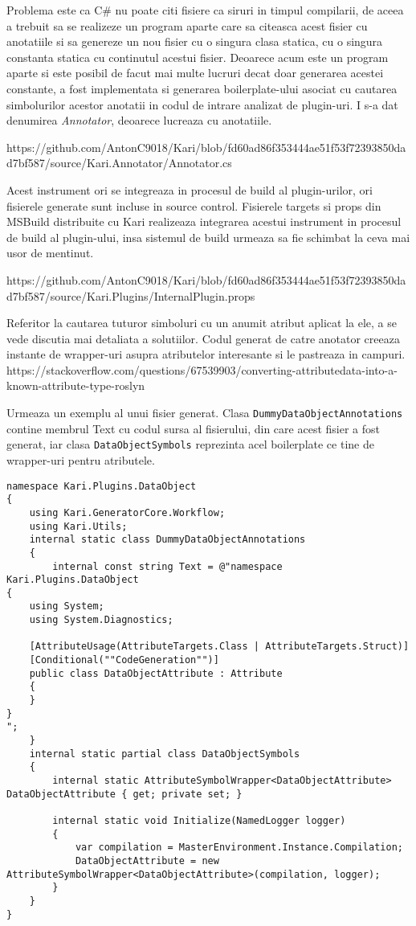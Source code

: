 \documentclass{report}
\begin{document}
Problema este ca C\# nu poate citi fisiere ca siruri in timpul
compilarii, de aceea a trebuit sa se realizeze un program aparte care sa
citeasca acest fisier cu anotatiile si sa genereze un nou fisier cu o
singura clasa statica, cu o singura constanta statica cu continutul
acestui fisier. Deoarece acum este un program aparte si este posibil de
facut mai multe lucruri decat doar generarea acestei constante, a fost
implementata si generarea boilerplate-ului asociat cu cautarea
simbolurilor acestor anotatii in codul de intrare analizat de
plugin-uri. I s-a dat denumirea \emph{Annotator}, deoarece lucreaza cu
anotatiile.

https://github.com/AntonC9018/Kari/blob/fd60ad86f353444ae51f53f72393850dad7bf587/source/Kari.Annotator/Annotator.cs

Acest instrument ori se integreaza in procesul de build al
plugin-urilor, ori fisierele generate sunt incluse in source control.
Fisierele targets si props din MSBuild distribuite cu Kari realizeaza
integrarea acestui instrument in procesul de build al plugin-ului, insa
sistemul de build urmeaza sa fie schimbat la ceva mai usor de mentinut.

https://github.com/AntonC9018/Kari/blob/fd60ad86f353444ae51f53f72393850dad7bf587/source/Kari.Plugins/InternalPlugin.props

Referitor la cautarea tuturor simboluri cu un anumit atribut aplicat la
ele, a se vede discutia mai detaliata a solutiilor. Codul generat de
catre anotator creeaza instante de wrapper-uri asupra atributelor
interesante si le pastreaza in campuri.
https://stackoverflow.com/questions/67539903/converting-attributedata-into-a-known-attribute-type-roslyn

Urmeaza un exemplu al unui fisier generat. Clasa
\texttt{DummyDataObjectAnnotations} contine membrul Text cu codul sursa
al fisierului, din care acest fisier a fost generat, iar clasa
\texttt{DataObjectSymbols} reprezinta acel boilerplate ce tine de
wrapper-uri pentru atributele.

\begin{lstlisting}
namespace Kari.Plugins.DataObject
{
    using Kari.GeneratorCore.Workflow;
    using Kari.Utils;
    internal static class DummyDataObjectAnnotations
    {
        internal const string Text = @"namespace Kari.Plugins.DataObject
{
    using System;
    using System.Diagnostics;

    [AttributeUsage(AttributeTargets.Class | AttributeTargets.Struct)]
    [Conditional(""CodeGeneration"")]
    public class DataObjectAttribute : Attribute
    {
    }
}
";
    }
    internal static partial class DataObjectSymbols
    {
        internal static AttributeSymbolWrapper<DataObjectAttribute> DataObjectAttribute { get; private set; }

        internal static void Initialize(NamedLogger logger)
        {
            var compilation = MasterEnvironment.Instance.Compilation;
            DataObjectAttribute = new AttributeSymbolWrapper<DataObjectAttribute>(compilation, logger);
        }
    }
}
\end{lstlisting}
\end{document}
